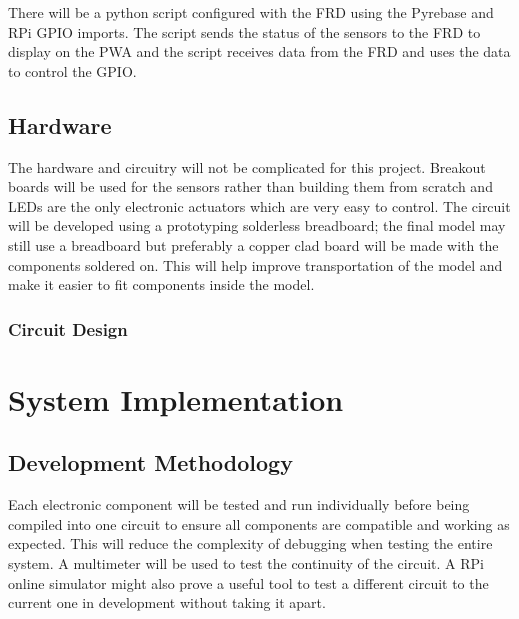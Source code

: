 \documentclass[final]{cmpreport}
\begin{document}
     There will be a python script configured with the FRD using the Pyrebase and RPi GPIO imports. The script sends the status of the sensors to the FRD to display on the PWA and the script receives data from the FRD and uses the data to control the GPIO.
    
    \subsection{Hardware} %
    
    The hardware and circuitry will not be complicated for this project. Breakout boards will be used for the sensors rather than building them from scratch and LEDs are the only electronic actuators which are very easy to control. The circuit will be developed using a prototyping solderless breadboard; the final model may still use a breadboard but preferably a copper clad board will be made with the components soldered on. This will help improve transportation of the model and make it easier to fit components inside the model. 
    
        \subsubsection{Circuit Design}
    
\section{System Implementation}


    \subsection{Development Methodology}
    
    Each electronic component will be tested and run individually before being compiled into one circuit to ensure all components are compatible and working as expected. This will reduce the complexity of debugging when testing the entire system. A multimeter will be used to test the continuity of the circuit. A RPi online simulator might also prove a useful tool to test a different circuit to the current one in development without taking it apart. 
    
\end{document}
